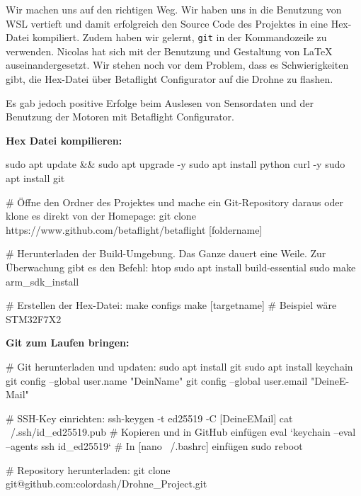 \documentclass{article}
\begin{document}
	
	Wir machen uns auf den richtigen Weg. Wir haben uns in die Benutzung von WSL vertieft und damit erfolgreich den Source Code des Projektes in eine Hex-Datei kompiliert. Zudem haben wir gelernt, \texttt{git} in der Kommandozeile zu verwenden. Nicolas hat sich mit der Benutzung und Gestaltung von LaTeX auseinandergesetzt. Wir stehen noch vor dem Problem, dass es Schwierigkeiten gibt, die Hex-Datei über Betaflight Configurator auf die Drohne zu flashen.
	
	Es gab jedoch positive Erfolge beim Auslesen von Sensordaten und der Benutzung der Motoren mit Betaflight Configurator.
	
	\textbf{Hex Datei kompilieren:}
	
	\begin{codebox}
		sudo apt update && sudo apt upgrade -y
		sudo apt install python curl -y
		sudo apt install git
		
		# Öffne den Ordner des Projektes und mache ein Git-Repository daraus oder klone es direkt von der Homepage:
		git clone https://www.github.com/betaflight/betaflight [foldername]
		
		# Herunterladen der Build-Umgebung. Das Ganze dauert eine Weile. Zur Überwachung gibt es den Befehl:
		htop
		sudo apt install build-essential
		sudo make arm_sdk_install
		
		# Erstellen der Hex-Datei:
		make configs 
		make [targetname]   # Beispiel wäre STM32F7X2
	\end{codebox}
	
	\textbf{Git zum Laufen bringen:}
	
	\begin{codebox}
		# Git herunterladen und updaten:
		sudo apt install git 
		sudo apt install keychain
		git config --global user.name "DeinName"
		git config --global user.email "DeineE-Mail"
		
		# SSH-Key einrichten:
		ssh-keygen -t ed25519 -C [DeineEMail]
		cat ~/.ssh/id_ed25519.pub  # Kopieren und in GitHub einfügen
		eval `keychain --eval --agents ssh id_ed25519`  # In [nano ~/.bashrc] einfügen
		sudo reboot 
		
		# Repository herunterladen:
		git clone git@github.com:colordash/Drohne_Project.git
	\end{codebox}
	
\end{document}
